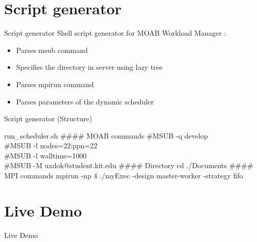 \documentclass[18pt]{beamer}
\begin{document}
\section{Script generator}
	\begin{frame}{Script generator}
		Shell script generator for MOAB Workload Manager :
		
		\begin{itemize}
			\pause
			\item Parses msub command
			
			\pause			
			\item Specifies the directory in server using lazy tree 
			 
			\pause
			\item Parses mpirun command
			
			\pause
			\item Parses parameters of the dynamic scheduler
		\end{itemize}
	\end{frame}
	
	
	
	\begin{frame}{Script generator (Structure)}
		
		\begin{block}{run\_scheduler.sh}
		        \#\#\#\# MOAB commands
		        \newline
		        \newline
				\#MSUB  -q develop\\
				\#MSUB  -l nodes=22:ppn=22\\
				\#MSUB  -l walltime=1000\\
				\#MSUB  -M uxdok@student.kit.edu
				\newline
				\newline
        				\#\#\#\# Directory
				\newline
				\newline
				cd ./Documents
				\newline
				\newline
        				\#\#\#\# MPI commands
        			\newline
        			\newline
				mpirun -np 4 ./myExec -design master-worker -strategy fifo
			
		\end{block}
	\end{frame}

\section{Live Demo}
	
	
	\begin{frame}
		\begin{center}
			Live Demo
		\end{center}		
	\end{frame}
	
\end{document}
